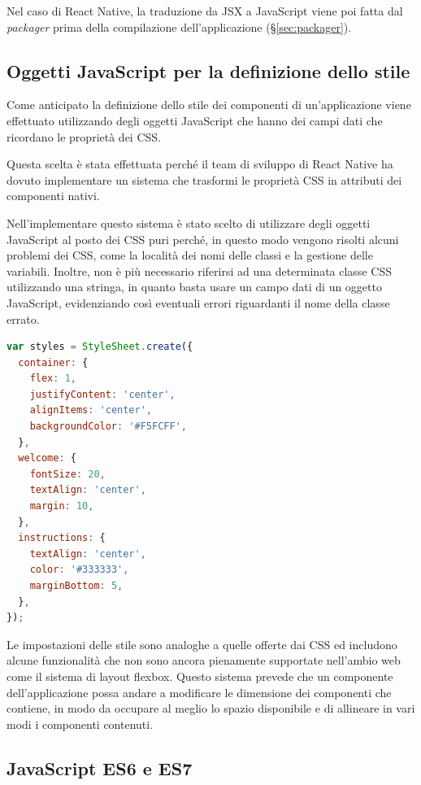 Nel caso di React Native, la traduzione da JSX a JavaScript viene poi fatta dal \textit{packager} prima della compilazione dell'applicazione (§\ref{sec:packager}).

\subsection{Oggetti JavaScript per la definizione dello stile}

Come anticipato la definizione dello stile dei componenti di un'applicazione viene effettuato utilizzando degli oggetti JavaScript che hanno dei campi dati che ricordano le proprietà dei CSS.

Questa scelta è stata effettuata perché il team di sviluppo di React Native ha dovuto implementare un sistema che trasformi le proprietà CSS in attributi dei componenti nativi.

Nell'implementare questo sistema è stato scelto di utilizzare degli oggetti JavaScript al posto dei CSS puri perché, in questo modo vengono risolti alcuni problemi dei CSS, come la località dei nomi delle classi e la gestione delle variabili.
Inoltre, non è più necessario riferirsi ad una determinata classe CSS utilizzando una stringa, in quanto basta usare un campo dati di un oggetto JavaScript, evidenziando così eventuali errori riguardanti il nome della classe errato.

\begin{lstlisting}[language=JavaScript, caption=Esempio della definizione dello stile di un componente di React Native]
var styles = StyleSheet.create({
  container: {
    flex: 1,
    justifyContent: 'center',
    alignItems: 'center',
    backgroundColor: '#F5FCFF',
  },
  welcome: {
    fontSize: 20,
    textAlign: 'center',
    margin: 10,
  },
  instructions: {
    textAlign: 'center',
    color: '#333333',
    marginBottom: 5,
  },
});
\end{lstlisting}

Le impostazioni delle stile sono analoghe a quelle offerte dai CSS ed includono alcune funzionalità che non sono ancora pienamente supportate nell'ambio web come il sistema di layout flexbox.
Questo sistema prevede che un componente dell'applicazione possa andare a modificare le dimensione dei componenti che contiene, in modo da occupare al meglio lo spazio disponibile e di allineare in vari modi i componenti contenuti.

\subsection{JavaScript ES6 e ES7}

